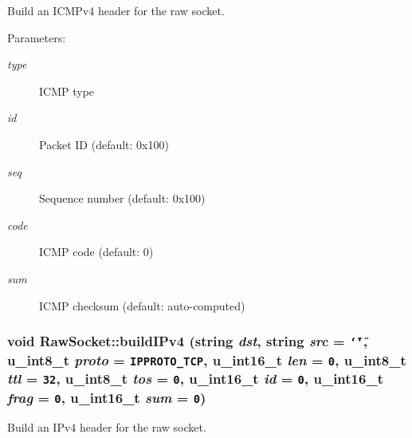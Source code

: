 Build an ICMPv4 header for the raw socket. 

\begin{Desc}
\item[Parameters:]
\begin{description}
\item[{\em type}]ICMP type \item[{\em id}]Packet ID (default: 0x100) \item[{\em seq}]Sequence number (default: 0x100) \item[{\em code}]ICMP code (default: 0) \item[{\em sum}]ICMP checksum (default: auto-computed) \end{description}
\end{Desc}
\hypertarget{classRawSocket_6c33975e6641e7d2e5ea34d3749c5cc5}{
\subsubsection[{buildIPv4}]{\setlength{\rightskip}{0pt plus 5cm}void RawSocket::buildIPv4 (string {\em dst}, \/  string {\em src} = {\tt \char`\"{}\char`\"{}}, \/  u\_\-int8\_\-t {\em proto} = {\tt IPPROTO\_\-TCP}, \/  u\_\-int16\_\-t {\em len} = {\tt 0}, \/  u\_\-int8\_\-t {\em ttl} = {\tt 32}, \/  u\_\-int8\_\-t {\em tos} = {\tt 0}, \/  u\_\-int16\_\-t {\em id} = {\tt 0}, \/  u\_\-int16\_\-t {\em frag} = {\tt 0}, \/  u\_\-int16\_\-t {\em sum} = {\tt 0})}}
\label{classRawSocket_6c33975e6641e7d2e5ea34d3749c5cc5}


Build an IPv4 header for the raw socket. 

